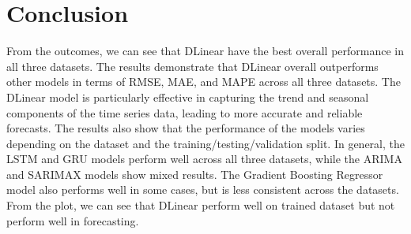 \documentclass{ieeeojies}
\begin{document}
\section{Conclusion}
From the outcomes, we can see that DLinear have the best overall performance in all three datasets. The results demonstrate that DLinear overall outperforms other models in terms of RMSE, MAE, and MAPE across all three datasets. The DLinear model is particularly effective in capturing the trend and seasonal components of the time series data, leading to more accurate and reliable forecasts. The results also show that the performance of the models varies depending on the dataset and the training/testing/validation split. In general, the LSTM and GRU models perform well across all three datasets, while the ARIMA and SARIMAX models show mixed results. The Gradient Boosting Regressor model also performs well in some cases, but is less consistent across the datasets. From the plot, we can see that DLinear perform well on trained dataset but not perform well in forecasting.
\end{document}
